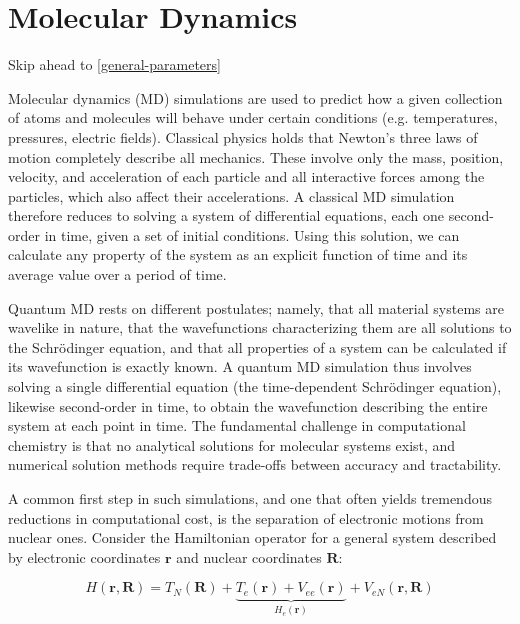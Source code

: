 \documentclass[12pt,letter,footinclude=true,headinclude=true,hyphens]{book} %
\begin{document}
    \chapter{Molecular Dynamics}
    
    \label{molecular-dynamics-intro}
    
    Skip ahead to \ref{general-parameters}
    
    Molecular dynamics (MD) simulations are used to predict how a given collection of atoms and molecules will behave under certain conditions (e.g. temperatures, pressures, electric fields). Classical physics holds that Newton's three laws of motion completely describe all mechanics. These involve only the mass, position, velocity, and acceleration of each particle and all interactive forces among the particles, which also affect their accelerations. A classical MD simulation therefore reduces to solving a system of differential equations, each one second-order in time, given a set of initial conditions. Using this solution, we can calculate any property of the system as an explicit function of time and its average value over a period of time.
    
    Quantum MD rests on different postulates; namely, that all material systems are wavelike in nature, that the wavefunctions characterizing them are all solutions to the Schr\"{o}dinger equation, and that all properties of a system can be calculated if its wavefunction is exactly known. A quantum MD simulation thus involves solving a single differential equation (the time-dependent Schr\"{o}dinger equation), likewise second-order in time, to obtain the wavefunction describing the entire system at each point in time. The fundamental challenge in computational chemistry is that no analytical solutions for molecular systems exist, and numerical solution methods require trade-offs between accuracy and tractability.
    
    A common first step in such simulations, and one that often yields tremendous reductions in computational cost, is the separation of electronic motions from nuclear ones. Consider the Hamiltonian operator for a general system described by electronic coordinates $\mathbf{r}$ and nuclear coordinates $\mathbf{R}$:
    
    \begin{equation}
    H(\mathbf{r}, \mathbf{R}) = T_N(\mathbf{R}) + \underbrace{T_e(\mathbf{r}) + V_{ee}(\mathbf{r})}_{H_e(\mathbf{r})} + V_{eN}(\mathbf{r}, \mathbf{R})
    \end{equation}
    
\end{document}
